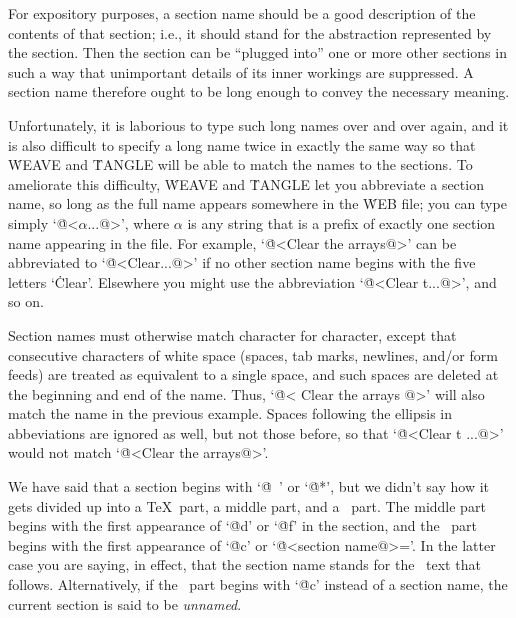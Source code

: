 For expository purposes, a section name should be a good description of the
contents of that section; i.e., it should stand for the abstraction
represented by the section. Then the section can be ``plugged into'' one or
more other sections in such a way
that unimportant details of its inner workings
are suppressed.  A section name therefore ought to be long enough to convey
the necessary meaning.

Unfortunately, it is laborious to type
such long names over and over again, and it is also difficult to specify a
long name twice in exactly the same way so that \.{WEAVE} and \.{TANGLE}
will be able to match the names to the sections. To ameliorate this difficulty,
\.{WEAVE} and \.{TANGLE} let you abbreviate a section name, so long as
the full name appears somewhere in the \.{WEB} file; you can type simply
`\.{@<$\alpha$...@>}', where $\alpha$ is any string that is a prefix of
exactly one section name appearing in the file. For example, `\.{@<Clear
the arrays@>}' can be abbreviated to `\.{@<Clear...@>}' if no other section
name begins with the five letters `\.{Clear}'.  Elsewhere
you might use the abbreviation `\.{@<Clear t...@>}', and so on.

Section names must otherwise match character for character, except
that consecutive characters of white space (spaces, tab marks, newlines, and/or
form feeds) are treated as equivalent to a single space, and such spaces are
deleted at the beginning and end of the name. Thus, `\.{@< Clear { }the
arrays @>}' will also match the name in the previous example.
Spaces following the ellipsis in abbeviations are ignored as well, but
not those before, so that `\.{@<Clear t ...@>}' would not match
`\.{@<Clear the arrays@>}'.

We have said that a section begins with `\.{@\ }' or `\.{@*}', but we
didn't say how it gets divided up into a \TeX\ part, a middle part,
and a \Cee\ part. The middle part begins with the first appearance of
`\.{@d}' or `\.{@f}' in the section, and the \Cee\ part begins with
the first appearance of `\.{@c}' or `\.{@<section name@>=}'.  In the
latter case you are saying, in effect, that the section name stands
for the \Cee\ text that follows. Alternatively, if the \Cee\ part
begins with `\.{@c}' instead of a section name, the current section is
said to be {\sl unnamed}.

